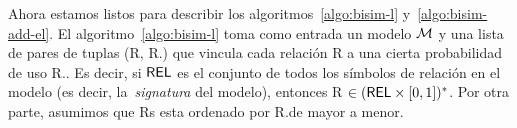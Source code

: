 


Ahora estamos listos para describir los algoritmos~\ref{algo:bisim-l}
y~\ref{algo:bisim-add-el}. El algoritmo~\ref{algo:bisim-l} toma como
entrada un modelo $\mathcal{M}$ y una lista de pares de tuplas (R, R.\puse) que vincula cada
relaci\'on R a una cierta probabilidad de uso R.\puse. Es decir, si $\textsf{REL}$ es el
conjunto de todos los s\'imbolos de relaci\'on en el modelo (es decir, la~\emph{signatura}
del modelo), entonces R $\in (\textsf{REL} \times [0,1])^*$. Por otra parte, asumimos que 
Rs esta ordenado por R.\puse de mayor a menor.



